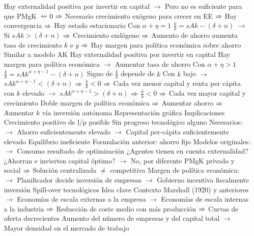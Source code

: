 \documentclass{nuevotema}
\begin{document}
\begin{esquemal}
				\4[] Hay externalidad positiva por invertir en capital
				\4[] $\to$ Pero no es suficiente para que PMgK $\nleftarrow 0$
				\4[] $\Rightarrow$ Necesario crecimiento exógeno para crecer en EE
				\4[] $\Rightarrow$ Hay convergencia
				\4[] $\Rightarrow$ Hay estado estacionario
				\4 Con $\alpha + \eta = 1$
				\4[] $\frac{\dot{k}}{k} = sAk - (\delta+n)$
				\4[] $\to$ Si $sAk > (\delta + n)$
				\4[] $\Rightarrow$ Crecimiento endógeno
				\4[] $\Rightarrow$ Aumento de ahorro aumenta tasa de crecimiento $k$ e $y$
				\4[] $\Rightarrow$ Hay margen para política económica sobre ahorro
				\4[] Similar a modelo AK
				\4[] Hay externalidad positiva por invertir en capital
				\4[] Hay margen para política económica
				\4[] $\to$ Aumentar tasa de ahorro
				\4 Con $\alpha + \eta > 1$
				\4[] $\frac{\dot{k}}{k} = sAk^{\alpha+\eta-1} - (\delta+n)$
				\4[] Signo de $\frac{\dot{k}}{k}$ depende de $k$
				\4[] Con $k$ bajo
				\4[] $\to$ $sAk^{\alpha+\eta-1} < (\delta+n)$
				\4[] $\Rightarrow$ $ \frac{\dot{k}}{k} < 0$
				\4[] $\Rightarrow$ Cada vez menor capital y renta per cápita
				\4[] con $k$ elevado
				\4[] $\to$ $sAk^{\alpha+\eta-1} > (\delta+n)$
				\4[] $\Rightarrow$ $\frac{\dot{k}}{k} < 0$
				\4[] $\Rightarrow$ Cada vez mayor capital y crecimiento
				\4[] Doble margen de política económica
				\4[] $\Rightarrow$ Aumentar ahorro
				\4[] $\Rightarrow$ Aumentar $k$ vía inversión autónoma
				\4[] Representación gráfica
				\4[] 
			\3 Implicaciones
				\4 Crecimiento positivo de l/p posible
				\4[] Sin progreso tecnológico alguno
				\4[] Necesarios:
				\4[] $\to$ Ahorro suficientemente elevado
				\4[] $\to$ Capital per-cápita suficientemente elevado
				\4 Equilibrio ineficiente
				\4[] Formulación anterior: ahorro fijo
				\4[] Modelos originales:
				\4[] $\to$ Consumo resultado de optimización
				\4[] ¿Agentes tienen en cuenta externalidad?
				\4[] ¿Ahorran e invierten capital óptimo?
				\4[] $\to$ No, por diferente PMgK privado y social
				\4[] $\Rightarrow$ Solución centralizada $\neq$ competitiva
				\4[] Margen de política económica:
				\4[] $\to$ Planificador decide inversión de empresas
				\4[] $\to$ Gobierno incentiva fiscalmente inversión
		\2 Spill-over tecnológicos
			\3 Idea clave
				\4 Contexto
				\4[] Marshall (1920) y anteriores
				\4[] $\to$ Economías de escala externas a la empresa
				\4[] $\to$ Economías de escala internas a la industria
				\4[] $\Rightarrow$ Reducción de coste medio con más producción
				\4[] $\Rightarrow$ Curvas de oferta decrecientes
				\4[] Aumento del número de empresas y del capital total
				\4[] $\to$ Mayor densidad en el mercado de trabajo

\end{esquemal}
\end{document}
